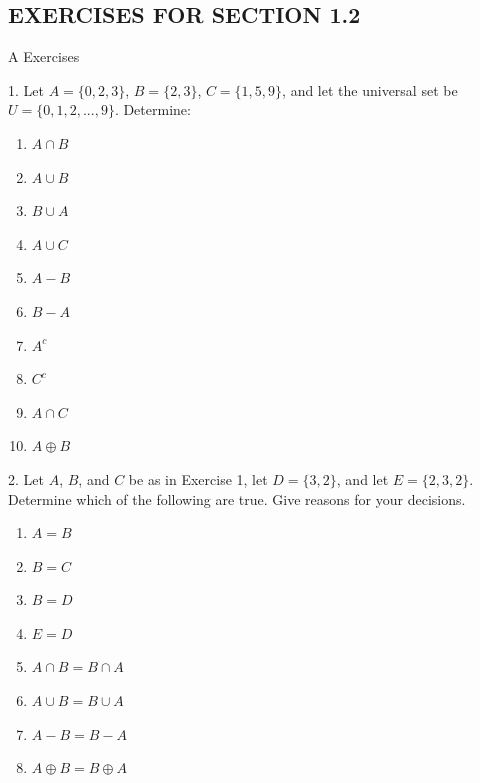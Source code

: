 \documentclass[10pt,]{book}
\theoremstyle{plain}
\theoremstyle{definition}
\begin{document}
\subsection[EXERCISES FOR SECTION 1.2 ]{EXERCISES FOR SECTION 1.2 }\label{exercises-1.2}
\hypertarget{exercisegroup-3}{}\typeout{************************************************}
\typeout{************************************************}
A Exercises%
\begin{exercisegroup}
\item[1.]\hypertarget{exercise-7}{} Let \(A = \{0, 2, 3\}\), \(B = \{2, 3\}\), \(C = \{1, 5, 9\}\), and let the universal set be \(U = \{0, 1, 2, . . . , 9\}\). Determine: 
\leavevmode%
\begin{multicols}{2}
\begin{enumerate}[label=(\alph*)]
\item\hypertarget{li-66}{}  \(A \cap  B\)  \item\hypertarget{li-67}{}  \(A \cup  B\)\item\hypertarget{li-68}{}  \(B \cup  A\)   \item\hypertarget{li-69}{}  \(A \cup  C\) \item\hypertarget{li-70}{}  \(A - B\)\item\hypertarget{li-71}{}  \(B - A\)\item\hypertarget{li-72}{}   \(A^c\) \item\hypertarget{li-73}{}   \(C^c\)\item\hypertarget{li-74}{}  \(A\cap C\)\item\hypertarget{li-75}{}   \(A\oplus B\) \end{enumerate}
\end{multicols}
\par\smallskip
\item[2.]\hypertarget{exercise-8}{}  Let \( A\), \( B\), and \( C\) be as in Exercise 1, let \(D = \{3, 2\}\), and let \(E = \{2, 3, 2\}\). Determine which of the
following are true. Give reasons for your decisions. 
\leavevmode%
\begin{multicols}{2}
\begin{enumerate}[label=(\alph*)]
\item\hypertarget{li-76}{}  \(A = B\) \item\hypertarget{li-77}{}  \(B = C\) \item\hypertarget{li-78}{}  \(B = D\) \item\hypertarget{li-79}{}  \(E=D\)\item\hypertarget{li-80}{}  \(A\cap B = B\cap A\)\item\hypertarget{li-81}{}  \(A \cup  B = B \cup  A\) \item\hypertarget{li-82}{}  \(A-B = B-A\) \item\hypertarget{li-83}{}  \(A \oplus  B = B \oplus  A\) \end{enumerate}

\end{multicols}
\end{exercisegroup}
\end{document}
